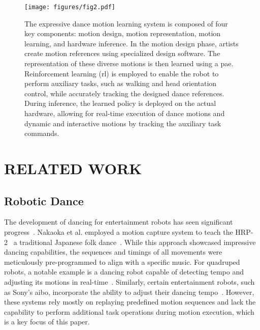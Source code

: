 \begin{figure*}[!t]
    \centering
    \texttt{[image: figures/fig2.pdf]}
    \caption{The expressive dance motion learning system is composed of four key components: motion design, motion representation, motion learning, and hardware inference. In the motion design phase, artists create motion references using specialized design software. The representation of these diverse motions is then learned using a \ac{pae}. Reinforcement learning (\ac{rl}) is employed to enable the robot to perform auxiliary tasks, such as walking and head orientation control, while accurately tracking the designed dance references. During inference, the learned policy is deployed on the actual hardware, allowing for real-time execution of dance motions and dynamic and interactive motions by tracking the auxiliary task commands.}
    \label{fig:system_overview}
    \vspace{-2ex}
\end{figure*}

\section{RELATED WORK}
\subsection{Robotic Dance}
The development of dancing for entertainment robots has seen significant progress~\cite{dance_robot_god}.
Nakaoka et al. employed a motion capture system to teach the HRP-2~\cite{HRP2} a traditional Japanese folk dance~\cite{dancing_humanoid}.
While this approach showcased impressive dancing capabilities, the sequences and timings of all movements were meticulously pre-programmed to align with a specific music.
For quadruped robots, a notable example is a dancing robot capable of detecting tempo and adjusting its motions in real-time~\cite{anymal_dance}.
Similarly, certain entertainment robots, such as Sony's aibo, incorporate the ability to adjust their dancing tempo~\cite{aibo_dance}.
However, these systems rely mostly on replaying predefined motion sequences and lack the capability to perform additional task operations during motion execution, which is a key focus of this paper.

